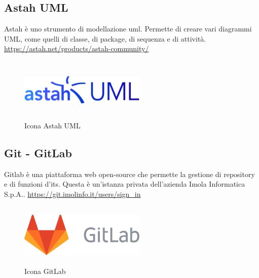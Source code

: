\subsection*{Astah UML}
Astah è uno strumento di modellazione \gls{uml}. Permette di creare vari diagrammi UML, come quelli di classe, di package, di sequenza e di attività.
\url{https://astah.net/products/astah-community/}
\begin{figure}[H]
    \centering
    \includegraphics[width=6cm, height=3cm]{./immagini/astah.png}
    \caption{Icona Astah UML}\label{fig:astah}
\end{figure}

\subsection*{Git - GitLab}
Gitlab è una piattaforma web open-source che permette la gestione di repository e di funzioni d'\gls{its}.
Questa è un'istanza privata dell'azienda Imola Informatica S.p.A..
\url{https://git.imolinfo.it/users/sign_in}
\begin{figure}[H]
    \centering
    \includegraphics[width=6cm, height=3cm]{./immagini/gitlab.png}
    \caption{Icona GitLab}\label{fig:gitlab}
\end{figure}
